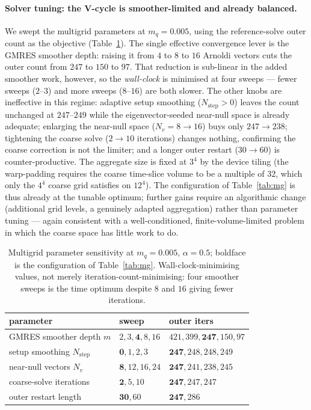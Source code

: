 \documentclass[12pt,a4paper]{article}
\begin{document}
\paragraph{Solver tuning: the V-cycle is smoother-limited and already balanced.}
We swept the multigrid parameters at $m_q=0.005$, using the reference-solve outer
count as the objective (Table~\ref{tab:tuning}). The single effective convergence
lever is the GMRES smoother depth: raising it from $4$ to $8$ to $16$ Arnoldi
vectors cuts the outer count from $247$ to $150$ to $97$. That reduction is sub-linear in the
added smoother work, however, so the \emph{wall-clock} is minimised at four
sweeps --- fewer sweeps ($2$--$3$) and more sweeps ($8$--$16$) are both slower. The
other knobs are ineffective in this regime: adaptive setup smoothing
($N_{\mathrm{step}}>0$) leaves the count unchanged at $247$--$249$ while the
eigenvector-seeded near-null space is already adequate; enlarging the near-null
space ($N_v=8\!\to\!16$) buys only $247\!\to\!238$; tightening the coarse solve
($2\!\to\!10$ iterations) changes nothing, confirming the coarse correction is not
the limiter; and a longer outer restart ($30\!\to\!60$) is counter-productive. The
aggregate size is fixed at $3^4$ by the device tiling (the warp-padding requires the
coarse time-slice volume to be a multiple of $32$, which only the $4^4$ coarse grid
satisfies on $12^4$). The configuration of Table~\ref{tab:mg} is thus already at the
tunable optimum; further gains require an algorithmic change (additional grid
levels, a genuinely adapted aggregation) rather than parameter tuning --- again
consistent with a well-conditioned, finite-volume-limited problem in which the
coarse space has little work to do.

\begin{table}[h]
\centering
\begin{tabular}{lll}
\toprule
parameter & sweep & outer iters \\
\midrule
GMRES smoother depth $m$ & $2,3,\mathbf{4},8,16$ & $421,399,\mathbf{247},150,97$ \\
setup smoothing $N_{\mathrm{step}}$ & $\mathbf{0},1,2,3$    & $\mathbf{247},248,248,249$ \\
near-null vectors $N_v$  & $\mathbf{8},12,16,24$ & $\mathbf{247},241,238,245$ \\
coarse-solve iterations  & $\mathbf{2},5,10$     & $\mathbf{247},247,247$ \\
outer restart length     & $\mathbf{30},60$      & $\mathbf{247},286$ \\
\bottomrule
\end{tabular}
\caption{Multigrid parameter sensitivity at $m_q=0.005$, $\alpha=0.5$; boldface is
the configuration of Table~\ref{tab:mg}. Wall-clock-minimising values, not merely
iteration-count-minimising: four smoother sweeps is the time optimum despite $8$ and
$16$ giving fewer iterations.}
\label{tab:tuning}
\end{table}
\end{document}
